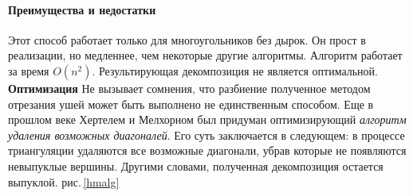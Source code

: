 \documentclass[11pt,a4paper]{extarticle}
\begin{document}
			\paragraph{Преимущества и недостатки}
			Этот способ работает только для многоугольников без дырок. Он прост в реализации, но медленнее, чем некоторые другие алгоритмы. 
			Алгоритм работает за время $O(n^{2})$. Результирующая декомпозиция не является оптимальной.\\
			\textbf{Оптимизация}\:\:
			Не вызывает сомнения, что разбиение полученное методом отрезания ушей может быть выполнено не единственным способом.
			Еще в прошлом веке Хертелем и Мелхорном был придуман оптимизирующий \emph{алгоритм удаления возможных диагоналей}.
			Его суть заключается в следующем: в процессе триангуляции удаляются все возможные диагонали, убрав которые не появляются невыпуклые вершины. 
			Другими словами, полученная декомпозиция остается выпуклой.
			рис.\,\ref{hmalg}
\end{document}
